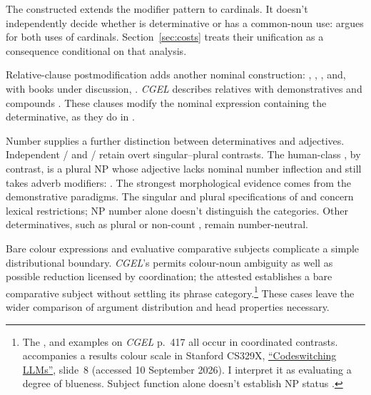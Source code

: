 \documentclass[12pt]{article}
\begin{document}
The constructed  extends the modifier pattern to cardinals. It doesn't independently decide whether  is determinative or has a common-noun use: \textcite{reynolds2026numerals} argues for both uses of cardinals. Section~\ref{sec:costs} treats their unification as a consequence conditional on that analysis.

Relative-clause postmodification adds another nominal construction: , , , and, with books under discussion, . \textit{CGEL} describes relatives with demonstratives and compounds \citep[414, 422--423]{huddleston2002}. These clauses modify the nominal expression containing the determinative, as they do in .

Number supplies a further distinction between determinatives and adjectives. Independent /\allowbreak{} and /\allowbreak{} retain overt singular--plural contrasts. The human-class , by contrast, is a plural NP whose adjective lacks nominal number inflection and still takes adverb modifiers:  \citep[418]{huddleston2002}. The strongest morphological evidence comes from the demonstrative paradigms. The singular and plural specifications of  and  concern lexical restrictions; NP number alone doesn't distinguish the categories. Other determinatives, such as plural or non-count , remain number-neutral.

Bare colour expressions and evaluative comparative subjects complicate a simple distributional boundary. \textit{CGEL}'s  permits colour-noun ambiguity as well as possible reduction licensed by coordination; the attested  establishes a bare comparative subject without settling its phrase category.\footnote{The ,  and  examples on \textit{CGEL} p.~417 all occur in coordinated contrasts.  accompanies a results colour scale in Stanford CS329X, \href{https://web.stanford.edu/class/cs329x/slides/Lecture12_B_Codeswitching\%20LLMs.pdf}{\enquote{Codeswitching LLMs}}, slide~8 (accessed 10 September 2026). I interpret it as evaluating a degree of blueness. Subject function alone doesn't establish NP status \citep[236]{huddleston2002}.} These cases leave the wider comparison of argument distribution and head properties necessary.
\end{document}
